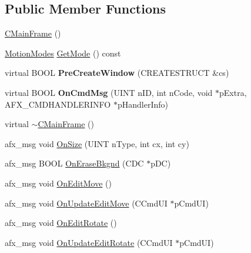 \subsection*{Public Member Functions}
\begin{DoxyCompactItemize}
\item 
\hyperlink{class_c_main_frame_af3e997aeae4148d2aaa4a1e1ae7bdd53}{C\+Main\+Frame} ()
\item 
\hyperlink{class_c_main_frame_a89722c82d82f95a761772a8dd9755b7b}{Motion\+Modes} \hyperlink{class_c_main_frame_a76c571ab75752dba8049e08f5e4ac920}{Get\+Mode} () const 
\item 
\hypertarget{class_c_main_frame_a549bf677c955c2898c3c683321633c16}{virtual B\+O\+O\+L {\bfseries Pre\+Create\+Window} (C\+R\+E\+A\+T\+E\+S\+T\+R\+U\+C\+T \&cs)}\label{class_c_main_frame_a549bf677c955c2898c3c683321633c16}

\item 
\hypertarget{class_c_main_frame_ade959eb0bab719bf06bb9b18ee407101}{virtual B\+O\+O\+L {\bfseries On\+Cmd\+Msg} (U\+I\+N\+T n\+I\+D, int n\+Code, void $\ast$p\+Extra, A\+F\+X\+\_\+\+C\+M\+D\+H\+A\+N\+D\+L\+E\+R\+I\+N\+F\+O $\ast$p\+Handler\+Info)}\label{class_c_main_frame_ade959eb0bab719bf06bb9b18ee407101}

\item 
virtual \hyperlink{class_c_main_frame_a8ae555f23fdf97edb4feb4d3e1bfa4ee}{$\sim$\+C\+Main\+Frame} ()
\item 
afx\+\_\+msg void \hyperlink{class_c_main_frame_adf171bf1f2c6f10cc85dbe8db3fc93f7}{On\+Size} (U\+I\+N\+T n\+Type, int cx, int cy)
\item 
afx\+\_\+msg B\+O\+O\+L \hyperlink{class_c_main_frame_a53a97f2229c5765329b2b59a21a54b0d}{On\+Erase\+Bkgnd} (C\+D\+C $\ast$p\+D\+C)
\item 
afx\+\_\+msg void \hyperlink{class_c_main_frame_af07c2610f9f5631e7eb7374d10d5fdd3}{On\+Edit\+Move} ()
\item 
afx\+\_\+msg void \hyperlink{class_c_main_frame_aadc40c4ab290da2368f6b87443f5ffbc}{On\+Update\+Edit\+Move} (C\+Cmd\+U\+I $\ast$p\+Cmd\+U\+I)
\item 
afx\+\_\+msg void \hyperlink{class_c_main_frame_a00f10667f35de1fa6693c1bea941d878}{On\+Edit\+Rotate} ()
\item 
afx\+\_\+msg void \hyperlink{class_c_main_frame_af098b8129775d1b5fb47fcaaabce8c01}{On\+Update\+Edit\+Rotate} (C\+Cmd\+U\+I $\ast$p\+Cmd\+U\+I)
\end{DoxyCompactItemize}
